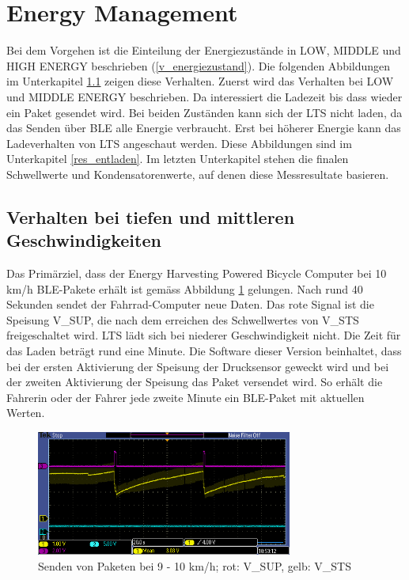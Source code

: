 \section{Energy Management}

Bei dem Vorgehen ist die Einteilung der Energiezustände in LOW, MIDDLE und HIGH ENERGY beschrieben (\ref{v_energiezustand}). Die folgenden Abbildungen im Unterkapitel \ref{tiefes_v} zeigen diese Verhalten. Zuerst wird das Verhalten bei LOW und MIDDLE ENERGY beschrieben. Da interessiert die Ladezeit bis dass wieder ein Paket gesendet wird. Bei beiden Zuständen kann sich der LTS nicht laden, da das Senden über BLE alle Energie verbraucht. Erst bei höherer Energie kann das Ladeverhalten von LTS angeschaut werden. Diese Abbildungen sind im Unterkapitel \ref{res_entladen}. Im letzten Unterkapitel stehen die finalen Schwellwerte und Kondensatorenwerte, auf denen diese Messresultate basieren.

\subsection{Verhalten bei tiefen und mittleren Geschwindigkeiten}
\label{tiefes_v}


Das Primärziel, dass der Energy Harvesting Powered Bicycle Computer bei 10 km/h BLE-Pakete erhält ist gemäss Abbildung \ref{paket_100kmh} gelungen. Nach rund 40 Sekunden sendet der Fahrrad-Computer neue Daten. Das rote Signal ist die Speisung V\_SUP, die nach dem erreichen des Schwellwertes von V\_STS freigeschaltet wird. LTS lädt sich bei niederer Geschwindigkeit nicht. Die Zeit für das Laden beträgt rund eine Minute. Die Software dieser Version beinhaltet, dass bei der ersten Aktivierung der Speisung der Drucksensor geweckt wird  und bei der zweiten Aktivierung der Speisung das Paket versendet wird. So erhält die Fahrerin oder der Fahrer jede zweite Minute ein BLE-Paket mit aktuellen Werten.

\begin{figure}[ht]
   \includegraphics[width=0.75\textwidth]{4Resultate/imag/pic_3.PNG}
    \caption{Senden von Paketen bei 9 - 10 km/h; rot: V\_SUP, gelb: V\_STS}
    \label{paket_100kmh}
\end{figure}

